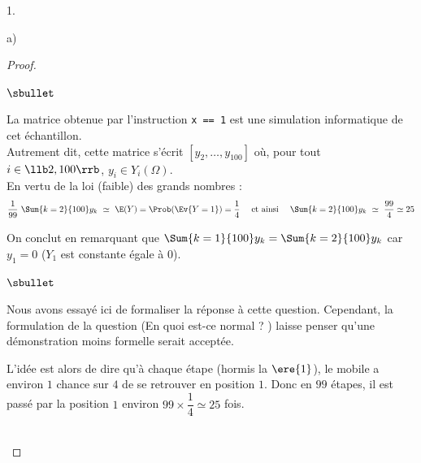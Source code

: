 \begin{noliste}{1.}
\begin{noliste}{a)}
\begin{proof}
\begin{noliste}{$\sbullet$}
      \item La matrice obtenue par l'instruction {\tt x == 1} est une
        simulation informatique de cet échantillon.\\
        Autrement dit, cette matrice s'écrit $[y_2, \ldots, y_{100}]$
        où, pour tout $i \in \llb 2, 100\rrb$, $y_i \in Y_i(\Omega)$.\\[.2cm]
        En vertu de la loi (faible) des grands nombres :
        \[
        \dfrac{1}{99} \ \Sum{k=2}{100} y_k \ \simeq \ \E(Y) =
        \Prob(\Ev{Y = 1}) = \dfrac{1}{4} \quad \text{ et ainsi } \quad
        \Sum{k=2}{100} y_k \ \simeq \ \dfrac{99}{4} \simeq 25
        \]       

      \item On conclut en remarquant que $\Sum{k=1}{100} y_k =
        \Sum{k=2}{100} y_k$ car $y_1 = 0$ ($Y_1$ est constante égale à
        $0$).
      \end{noliste}
      \begin{remark}%
        \begin{noliste}{$\sbullet$}
        \item Nous avons essayé ici de formaliser la réponse à cette
          question. Cependant, la formulation de la question (\og En
          quoi est-ce normal ? \fg{}) laisse penser qu'une
          démonstration moins formelle serait acceptée.
        \item L'idée est alors de dire qu'à chaque étape (hormis la
          $\ere{1}$), le mobile a environ $1$ chance sur $4$ de se
          retrouver en position $1$. Donc en $99$ étapes, il est passé
          par la position $1$ environ $99 \times \dfrac{1}{4} \simeq
          25$ fois.
        \end{noliste}
      \end{remark}~\\[-1.4cm]
    \end{proof}
  \end{noliste}
\end{noliste}


